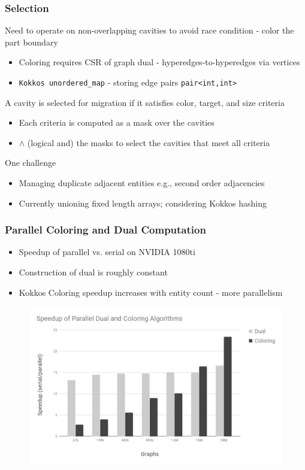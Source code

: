 \documentclass{beamer}
\begin{document}
\begin{frame}
  \frametitle{Selection}
  Need to operate on non-overlapping cavities to avoid race condition - color the part boundary
  \begin{itemize}
    \item Coloring requires CSR of graph dual - hyperedges-to-hyperedges via vertices
    \item \texttt{Kokkos unordered\_map} - storing edge pairs \texttt{pair<int,int>}
  \end{itemize}
  A cavity is selected for migration if it satisfies color, target, and size criteria
  \begin{itemize}
    \item Each criteria is computed as a mask over the cavities
    \item $\land$ (logical and) the masks to select the cavities that meet all criteria
  \end{itemize}
  One challenge 
  \begin{itemize}
    \item Managing duplicate adjacent entities e.g., second order
  adjacencies
    \item Currently unioning fixed length arrays; considering Kokkos hashing
  \end{itemize}
 \end{frame}

\begin{frame}
  \frametitle{Parallel Coloring and Dual Computation}
  \begin{itemize}
    \item Speedup of parallel vs. serial on NVIDIA 1080ti
    \item Construction of dual is roughly constant
    \item Kokkos Coloring speedup increases with entity count - more parallelism
  \end{itemize}
  \begin{figure}
    \centering
    \includegraphics[width=.7\textwidth]{figures/kkColoringAndDual.png}
  \end{figure}
\end{frame}
\end{document}
